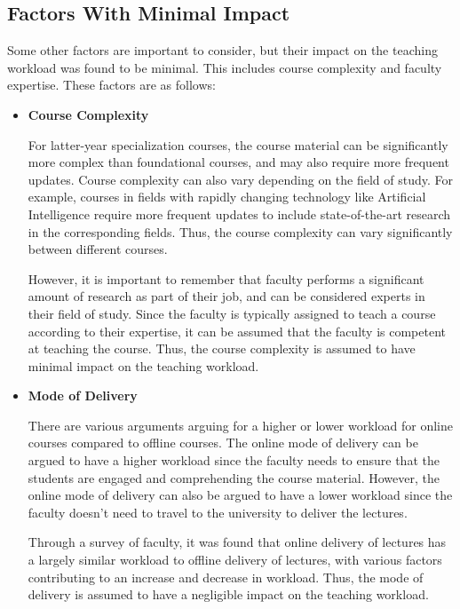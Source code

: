 \subsection{Factors With Minimal Impact}

Some other factors are important to consider, but their impact on the teaching workload was found to be minimal. This includes course complexity and faculty expertise. These factors are as follows:

\begin{itemize}
  \item  \textbf{Course Complexity}

        For latter-year specialization courses, the course material can be significantly more complex than foundational courses, and may also require more frequent updates. Course complexity can also vary depending on the field of study. For example, courses in fields with rapidly changing technology like Artificial Intelligence require more frequent updates to include state-of-the-art research in the corresponding fields. Thus, the course complexity can vary significantly between different courses.

        However, it is important to remember that faculty performs a significant amount of research as part of their job, and can be considered experts in their field of study. Since the faculty is typically assigned to teach a course according to their expertise, it can be assumed that the faculty is competent at teaching the course. Thus, the course complexity is assumed to have minimal impact on the teaching workload.

  \item \textbf{Mode of Delivery}

        There are various arguments arguing for a higher or lower workload for online courses compared to offline courses. The online mode of delivery can be argued to have a higher workload since the faculty needs to ensure that the students are engaged and comprehending the course material. However, the online mode of delivery can also be argued to have a lower workload since the faculty doesn't need to travel to the university to deliver the lectures.

        Through a survey of faculty, it was found that online delivery of lectures has a largely similar workload to offline delivery of lectures, with various factors contributing to an increase and decrease in workload. Thus, the mode of delivery is assumed to have a negligible impact on the teaching workload.

\end{itemize}

